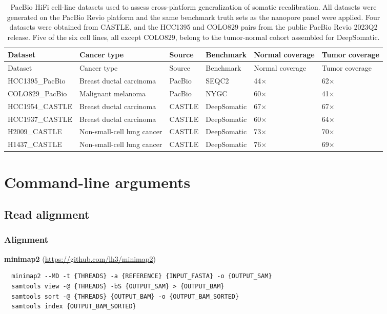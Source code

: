 \documentclass[pdflatex,sn-nature]{sn-jnl}
\begin{document}
\clearpage
{\small
\begin{longtable}{@{}llllll@{}}
  \caption[PacBio HiFi cell-line datasets used for the cross-platform analysis]%
  {PacBio HiFi cell-line datasets used to assess cross-platform generalization of somatic recalibration. All datasets were generated on the PacBio Revio platform and the same benchmark truth sets as the nanopore panel were applied. Four datasets were obtained from CASTLE, and the HCC1395 and COLO829 pairs from the public PacBio Revio 2023Q2 release. Five of the six cell lines, all except COLO829, belong to the tumor-normal cohort assembled for DeepSomatic.}
  \label{tab:pacbio-datasets}\\
  \toprule
  Dataset & Cancer type & Source & Benchmark & Normal coverage & Tumor coverage \\
  \midrule
  \endfirsthead
  \toprule
  Dataset & Cancer type & Source & Benchmark & Normal coverage & Tumor coverage \\
  \midrule
  \endhead
  \bottomrule
  \endlastfoot
  HCC1395\_PacBio & Breast ductal carcinoma    & PacBio & SEQC2       & 44$\times$    & 62$\times$ \\
  COLO829\_PacBio & Malignant melanoma         & PacBio & NYGC        & 60$\times$    & 41$\times$ \\
  HCC1954\_CASTLE & Breast ductal carcinoma    & CASTLE & DeepSomatic & 67$\times$    & 67$\times$ \\
  HCC1937\_CASTLE & Breast ductal carcinoma    & CASTLE & DeepSomatic & 60$\times$    & 64$\times$ \\
  H2009\_CASTLE   & Non-small-cell lung cancer & CASTLE & DeepSomatic & 73$\times$    & 70$\times$ \\
  H1437\_CASTLE   & Non-small-cell lung cancer & CASTLE & DeepSomatic & 76$\times$    & 69$\times$ \\
\end{longtable}
}

\clearpage

\section{Command-line arguments}

\subsection{Read alignment}
\subsubsection{Alignment}
\label{supp:alignment}
\textbf{minimap2} (\url{https://github.com/lh3/minimap2})
\begin{verbatim}
  minimap2 --MD -t {THREADS} -a {REFERENCE} {INPUT_FASTA} -o {OUTPUT_SAM}
  samtools view -@ {THREADS} -bS {OUTPUT_SAM} > {OUTPUT_BAM}
  samtools sort -@ {THREADS} {OUTPUT_BAM} -o {OUTPUT_BAM_SORTED}
  samtools index {OUTPUT_BAM_SORTED}
\end{verbatim}
\end{document}
